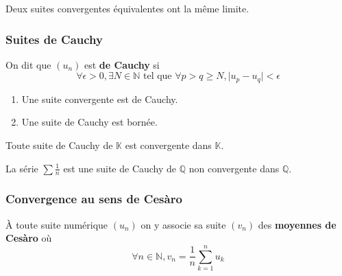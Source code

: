 
	\begin{proposition}
		Deux suites convergentes équivalentes ont la même limite.
	\end{proposition}

	\subsubsection{Suites de Cauchy}


	\begin{definition}
		On dit que $(u_n)$ est \textbf{de Cauchy} si
		\[ \forall \epsilon > 0, \exists N \in \mathbb{N} \text{ tel que } \forall p > q \geq N, \vert u_p - u_q \vert < \epsilon \]
	\end{definition}

	\begin{proposition}
		\begin{enumerate}[label=(\roman*)]
			\item Une suite convergente est de Cauchy.
			\item Une suite de Cauchy est bornée.
		\end{enumerate}
	\end{proposition}

	\begin{theorem}
		Toute suite de Cauchy de $\mathbb{K}$ est convergente dans $\mathbb{K}$.
	\end{theorem}


	\begin{cexample}
		La série $\sum \frac{1}{n}$ est une suite de Cauchy de $\mathbb{Q}$ non convergente dans $\mathbb{Q}$.
	\end{cexample}

	\newpage

	\subsubsection{Convergence au sens de Cesàro}


	\begin{definition}
		À toute suite numérique $(u_n)$ on y associe sa suite $(v_n)$ des \textbf{moyennes de Cesàro} où
		\[ \forall n \in \mathbb{N}, v_n = \frac{1}{n} \sum_{k=1}^{n} u_k \]
	\end{definition}

